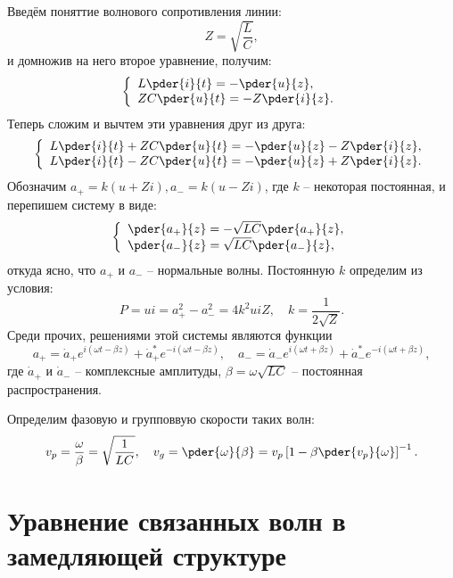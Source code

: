 \documentclass{hedwork}
\begin{document}
Введём поняттие волнового сопротивления линии:
\begin{equation}
    Z = \sqrt{\frac{L}{C}},
\end{equation}
и домножив на него второе уравнение, получим:
\begin{equation}
    \left\{
        \begin{array}{l}
            L\pder{i}{t} = -\pder{u}{z},\\
            ZC\pder{u}{t} = -Z\pder{i}{z}.
    \end{array}
    \right.
\end{equation}
Теперь сложим и вычтем эти уравнения друг из друга:
\begin{equation}
    \left\{
        \begin{array}{l}
            L\pder{i}{t} + ZC\pder{u}{t} = -\pder{u}{z} - Z\pder{i}{z},\\
            L\pder{i}{t} - ZC\pder{u}{t} = -\pder{u}{z} + Z\pder{i}{z}.
    \end{array}
    \right.
\end{equation}
Обозначим \( a_+ = k(u + Zi), a_- = k(u - Zi) \), где \( k \) -- некоторая
постоянная, и перепишем систему в виде:
\begin{equation}
    \left\{
        \begin{array}{l}
            \pder{a_+}{z} = -\sqrt{LC}\pder{a_+}{z},\\
            \pder{a_-}{z} = \sqrt{LC}\pder{a_-}{z},
    \end{array}
    \right.
\end{equation}
откуда ясно, что \( a_+ \) и \( a_- \) -- нормальные волны. Постоянную \( k \)
определим из условия:
\begin{equation}
    P = ui = a_+^2 - a_-^2 = 4k^2uiZ,\quad k = \frac{1}{2\sqrt{Z}}.
\end{equation}
Среди прочих, решениями этой системы являются функции
\begin{equation}
    a_+ = \dot{a}_+e^{i(\omega t - \beta z)} +
          \dot{a}_+^*e^{-i(\omega t - \beta z)},\quad
    a_- = \dot{a}_-e^{i(\omega t + \beta z)} +
          \dot{a}_-^*e^{-i(\omega t + \beta z)},
\end{equation}
где \( \dot{a}_+ \) и \( \dot{a}_- \) -- комплексные амплитуды,
\( \beta = \omega\sqrt{LC} \) -- постоянная распространения.

Определим фазовую и групповвую скорости таких волн:
\begin{equation}
    v_p = \frac{\omega}{\beta} = \sqrt{\frac{1}{LC}},\quad
    v_g = \pder{\omega}{\beta} = v_p\left[1-\beta\pder{v_p}{\omega}\right]^{-1}.
\end{equation}

\section{Уравнение связанных волн в замедляющей структуре}
\end{document}

